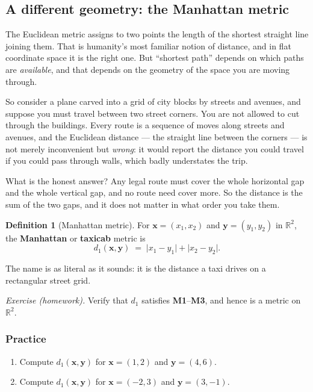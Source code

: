 \documentclass[11pt]{article}
\theoremstyle{definition}
\newtheorem{defn}{Definition}[section]
\theoremstyle{remark}
\newcommand{\R}{\mathbb{R}}
\newcommand{\vc}[1]{\mathbf{#1}}
\begin{document}
\subsection{A different geometry: the Manhattan metric}
The Euclidean metric assigns to two points the length of the shortest straight
line joining them. That is humanity's most familiar notion of distance, and in
flat coordinate space it is the right one. But ``shortest path'' depends on which
paths are \emph{available}, and that depends on the geometry of the space you are
moving through.

So consider a plane carved into a grid of city blocks by streets and avenues,
and suppose you must travel between two street corners. You are not allowed to
cut through the buildings. Every route is a sequence of moves along streets and
avenues, and the Euclidean distance --- the straight line between the corners
--- is not merely inconvenient but \emph{wrong}: it would report the distance
you could travel if you could pass through walls, which badly understates the
trip.

What is the honest answer? Any legal route must cover the whole horizontal gap
and the whole vertical gap, and no route need cover more. So the distance is the
sum of the two gaps, and it does not matter in what order you take them.

\begin{defn}[Manhattan metric]
For $\vc{x}=(x_1,x_2)$ and $\vc{y}=(y_1,y_2)$ in $\R^{2}$, the
\textbf{Manhattan} or \textbf{taxicab} metric is
\[
  d_1(\vc{x},\vc{y}) \;=\; \lvert x_1-y_1\rvert + \lvert x_2-y_2\rvert .
\]
\end{defn}

\noindent The name is as literal as it sounds: it is the distance a taxi drives
on a rectangular street grid.

\smallskip
\noindent\emph{Exercise (homework).} Verify that $d_1$ satisfies
\textbf{M1}--\textbf{M3}, and hence is a metric on $\R^{2}$.

\subsubsection*{Practice}
\begin{enumerate}[label=\textbf{P\arabic*.},leftmargin=2.8em,itemsep=5pt,
                  topsep=5pt]
  \item Compute $d_1(\vc{x},\vc{y})$ for $\vc{x}=(1,2)$ and $\vc{y}=(4,6)$.
  \item Compute $d_1(\vc{x},\vc{y})$ for $\vc{x}=(-2,3)$ and $\vc{y}=(3,-1)$.
\end{enumerate}
\end{document}

